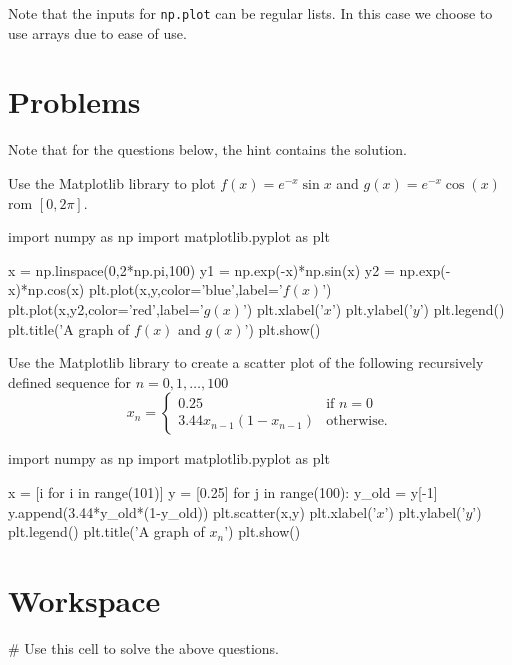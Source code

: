 \documentclass{ximera}
\begin{document}
Note that the inputs for \verb|np.plot| can be regular lists. In this case we choose to use arrays due to ease of use.

\section{Problems}

Note that for the questions below, the hint contains the solution.

\begin{question}
Use the Matplotlib library to plot $f(x)=e^{-x}\sin{x}$ and $g(x)=e^{-x}\cos(x)$ rom $[0,2\pi]$.
	\begin{hint}
\begin{sageCell}
import numpy as np
import matplotlib.pyplot as plt

x = np.linspace(0,2*np.pi,100)
y1 = np.exp(-x)*np.sin(x)
y2 = np.exp(-x)*np.cos(x)
plt.plot(x,y,color='blue',label='$f(x)$')
plt.plot(x,y2,color='red',label='$g(x)$')
plt.xlabel('$x$')
plt.ylabel('$y$')
plt.legend()
plt.title('A graph of $f(x)$ and $g(x)$')
plt.show()
\end{sageCell}
	\end{hint}
\end{question}

\begin{question}
Use the Matplotlib library to create a scatter plot of the following recursively defined sequence for $n=0,1,\dots,100$ $$x_n=\begin{cases}0.25 & \text{if $n=0$}\\ 3.44x_{n-1}(1-x_{n-1}) & \text{otherwise.}\end{cases}$$
	\begin{hint}
\begin{sageCell}
import numpy as np
import matplotlib.pyplot as plt

x = [i for i in range(101)]
y = [0.25]
for j in range(100):
	y_old = y[-1]
	y.append(3.44*y_old*(1-y_old))
plt.scatter(x,y)
plt.xlabel('$x$')
plt.ylabel('$y$')
plt.legend()
plt.title('A graph of $x_n$')
plt.show()
\end{sageCell}
	\end{hint}
\end{question}

\section{Workspace}

\begin{sageCell}
# Use this cell to solve the above questions.
\end{sageCell}
\end{document}
